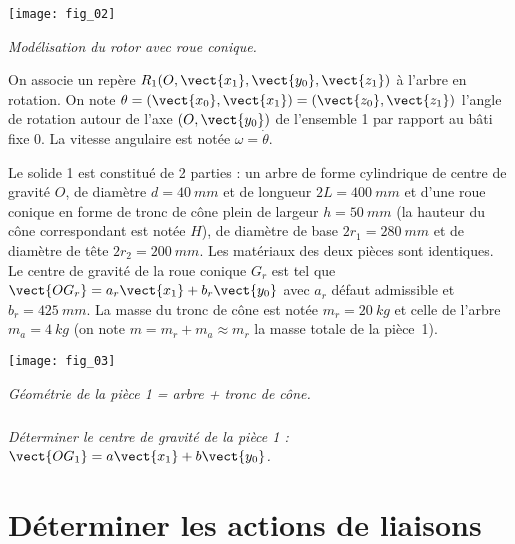 \begin{multicols}{2}
\begin{center}
\texttt{[image: fig\_02]}

\textit{Modélisation du rotor avec roue conique.}
\end{center}

On associe un repère $R_1(O,\vect{x_1},\vect{y_0},\vect{z_1})$ à l'arbre en rotation. On note $\theta=(\vect{x_0},\vect{x_1})=(\vect{z_0},\vect{z_1})$ l'angle de rotation autour de l'axe $(O,\vect{y_0})$ de l'ensemble 1 par rapport au bâti fixe 0. La vitesse angulaire est notée $\omega=\dot{\theta}$. 

Le solide 1 est constitué de 2 parties : un arbre de forme cylindrique de centre de gravité $O$, de diamètre $d=\SI{40}{mm}$ et de longueur $2L=\SI{400}{mm}$ et d'une roue conique en forme de tronc de cône plein de largeur $h=\SI{50}{mm}$ (la hauteur du cône correspondant est notée $H$), de diamètre de base $2r_1=\SI{280}{mm}$ et de diamètre de tête $2r_2=\SI{200}{mm}$. Les matériaux des deux pièces sont identiques. Le centre de gravité de la roue conique $G_r$ est tel que $\vect{OG_r}=a_r \vect{x_1}+b_r\vect{y_0}$ avec $a_r$ défaut admissible et $b_r=\SI{425}{mm}$. La masse du tronc de cône est notée $m_r=\SI{20}{kg}$ et celle de l'arbre $m_a=\SI{4}{kg}$ (on note $m=m_r+m_a\approx m_r$ la masse totale de la pièce~1).



\begin{center}
\texttt{[image: fig\_03]}

\textit{Géométrie de la pièce 1 = arbre + tronc de cône.}
\end{center}
%
%
%

\subparagraph{}
\textit{Déterminer le centre de gravité de la pièce 1 : $\vect{OG_1}=a \vect{x_1}+b \vect{y_0}$.}


\section*{Déterminer les actions de liaisons\\}


\end{multicols}
